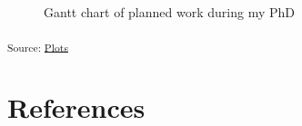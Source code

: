 \documentclass[
  letterpaper,
  DIV=11,
  numbers=noendperiod]{scrartcl}
\begin{document}
\begin{figure}[H]


\caption{\label{fig-gantt-chart}Gantt chart of planned work during my
PhD}

\end{figure}%

\textsubscript{Source:
\href{https://juliam98.github.io/phd-upgrade-proposal/notebooks/plots-preview.html\#cell-fig-gantt-chart}{Plots}}

\newpage{}

\section{References}\label{references}

\printbibliography[heading=none]
\end{document}
